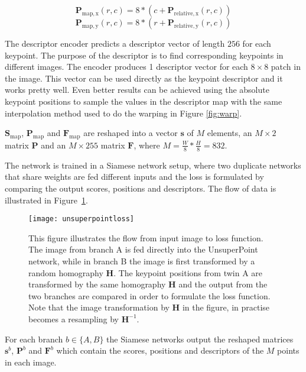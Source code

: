 \begin{equation}
\textbf{P}_{\mathrm{map,x}}(r,c) = 8 * (c + \textbf{P}_{\mathrm{relative,x}}(r,c))
\end{equation}
\begin{equation}
\textbf{P}_{\mathrm{map,y}}(r,c) = 8 * (r + \textbf{P}_{\mathrm{relative,y}}(r,c))
\end{equation}

The descriptor encoder predicts a descriptor vector of length $256$ for each keypoint. The purpose of the descriptor is to find corresponding keypoints in different images. The encoder produces 1 descriptor vector for each $8\times 8$ patch in the image. This vector can be used directly as the keypoint descriptor and it works pretty well. Even better results can be achieved using the absolute keypoint positions to sample the values in the descriptor map with the same interpolation method used to do the warping in Figure \ref{fig:warp}.

$\textbf{S}_{\textrm{map}}$, $\textbf{P}_{\mathrm{map}}$ and $\textbf{F}_{\mathrm{map}}$ are reshaped into a vector $\textbf{s}$ of $M$ elements, an $M\times 2$ matrix $\textbf{P}$ and an $M\times 255$ matrix $\textbf{F}$, where $M=\frac{W}{8}*\frac{H}{8}=832$.

The network is trained in a Siamese network setup, where two duplicate networks that share weights are fed different inputs and the loss is formulated by comparing the output scores, positions and descriptors. The flow of data is illustrated in Figure~\ref{fig:unsuperpointloss}.

\begin{figure}[H]
	\centering
	\texttt{[image: unsuperpointloss]}
	\caption{This figure illustrates the flow from input image to loss function. The image from branch A is fed directly into the UnsuperPoint network, while in branch B the image is first transformed by a random homography $\textbf{H}$. The keypoint positions from twin A are transformed by the same homography $\textbf{H}$ and the output from the two branches are compared in order to formulate the loss function. Note that the image transformation by $\textbf{H}$ in the figure, in practise becomes a resampling by $\textbf{H}^{-1}$.}
	\label{fig:unsuperpointloss}
\end{figure}

For each branch $b\in\{A,B\}$ the Siamese networks output the reshaped matrices $\textbf{s}^b$, $\textbf{P}^b$ and $\textbf{F}^b$ which contain the scores, positions and descriptors of the $M$ points in each image.

